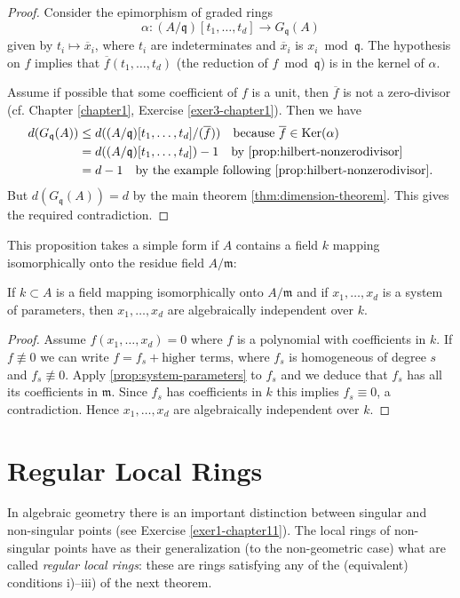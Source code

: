 \begin{proof}
Consider the epimorphism of graded rings
\[
    \alpha \colon (A/\mathfrak{q})[t_1, \ldots, t_d] \to G_{\mathfrak{q}}(A)
\]
given by $t_i \mapsto \overline{x}_i$, where $t_i$ are indeterminates and $\overline{x}_i$ is $x_i \bmod \mathfrak{q}$. The hypothesis on $f$ implies that $\overline{f}(t_1, \ldots, t_d)$ (the reduction of $f \bmod \mathfrak{q}$) is in the kernel of $\alpha$.

Assume if possible that some coefficient of $f$ is a unit, then $\overline{f}$ is not a zero-divisor (cf. Chapter \ref{chapter1}, Exercise \ref{exer3-chapter1}). Then we have
\begin{align*}
    d(G_{\mathfrak{q}}(A)) &\leq d((A/\mathfrak{q})[t_1, \ldots, t_d]/(\overline{f})) \quad \text{because } \overline{f} \in \operatorname{Ker}(\alpha) \\
    &= d((A/\mathfrak{q})[t_1, \ldots, t_d]) - 1 \quad \text{by \eqref{prop:hilbert-nonzerodivisor}} \\
    &= d - 1 \quad \text{by the example following \eqref{prop:hilbert-nonzerodivisor}.}
\end{align*}
But $d(G_{\mathfrak{q}}(A)) = d$ by the main theorem \eqref{thm:dimension-theorem}. This gives the required contradiction.
\end{proof}

This proposition takes a simple form if $A$ contains a field $k$ mapping isomorphically onto the residue field $A/\mathfrak{m}$:

\begin{corollary}\label{cor:algebraic-independence}
If $k \subset A$ is a field mapping isomorphically onto $A/\mathfrak{m}$ and if $x_1, \ldots, x_d$ is a system of parameters, then $x_1, \ldots, x_d$ are algebraically independent over $k$.
\end{corollary}

\begin{proof}
Assume $f(x_1, \ldots, x_d) = 0$ where $f$ is a polynomial with coefficients in $k$. If $f \not\equiv 0$ we can write $f = f_s + \text{higher terms}$, where $f_s$ is homogeneous of degree $s$ and $f_s \not\equiv 0$. Apply \eqref{prop:system-parameters} to $f_s$ and we deduce that $f_s$ has all its coefficients in $\mathfrak{m}$. Since $f_s$ has coefficients in $k$ this implies $f_s \equiv 0$, a contradiction. Hence $x_1, \ldots, x_d$ are algebraically independent over $k$.
\end{proof}

\section*{Regular Local Rings}
In algebraic geometry there is an important distinction between singular and non-singular points (see Exercise \ref{exer1-chapter11}). The local rings of non-singular points have as their generalization (to the non-geometric case) what are called \emph{regular local rings}: these are rings satisfying any of the (equivalent) conditions i)--iii) of the next theorem.

